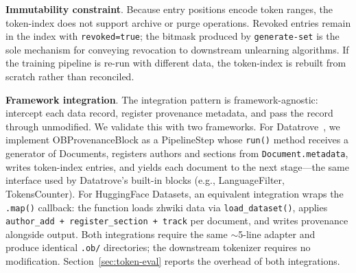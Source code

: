 \textbf{Immutability constraint}. Because entry positions encode token ranges, the token-index does not support archive or purge operations. Revoked entries remain in the index with \texttt{revoked=true}; the bitmask produced by \texttt{generate-set} is the sole mechanism for conveying revocation to downstream unlearning algorithms. If the training pipeline is re-run with different data, the token-index is rebuilt from scratch rather than reconciled.

\textbf{Framework integration}. The integration pattern is framework-agnostic: intercept each data record, register provenance metadata, and pass the record through unmodified. We validate this with two frameworks. For Datatrove~\cite{penedo2024datatrove}, we implement OBProvenanceBlock as a PipelineStep whose \texttt{run()} method receives a generator of Documents, registers authors and sections from \texttt{Document.metadata}, writes token-index entries, and yields each document to the next stage---the same interface used by Datatrove's built-in blocks (e.g., LanguageFilter, TokensCounter). For HuggingFace Datasets, an equivalent integration wraps the \texttt{.map()} callback: the function loads zhwiki data via \texttt{load\_dataset()}, applies \texttt{author\_add + register\_section + track} per document, and writes provenance alongside output. Both integrations require the same $\sim$5-line adapter and produce identical \texttt{.ob/} directories; the downstream tokenizer requires no modification. Section~\ref{sec:token-eval} reports the overhead of both integrations.
